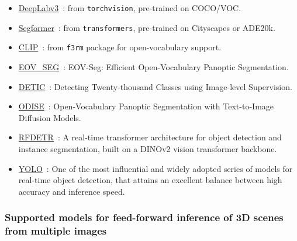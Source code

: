 \documentclass{article}
\providecommand{\tightlist}{%
  \setlength{\itemsep}{0pt}\setlength{\parskip}{0pt}}
\begin{document}
\begin{itemize}
\tightlist
\item
  \href{https://arxiv.org/abs/1706.05587}{DeepLabv3}~\cite{chen2017rethinking}: from \texttt{torchvision}, pre-trained on COCO/VOC.
\item
  \href{https://arxiv.org/abs/2105.15203}{Segformer}~\cite{xie2021segformer}: from \texttt{transformers}, pre-trained on Cityscapes or ADE20k.
\item
  \href{https://arxiv.org/abs/2212.09506}{CLIP}~\cite{lin2023clip}: from \texttt{f3rm} package for open-vocabulary support.
\item
  \href{https://arxiv.org/abs/2412.08628v1}{EOV\_SEG}~\cite{eov_seg}: EOV-Seg: Efficient Open-Vocabulary Panoptic Segmentation.
\item
  \href{https://arxiv.org/abs/2201.02605}{DETIC}~\cite{detic}: Detecting Twenty-thousand Classes using Image-level Supervision.
\item
  \href{https://arxiv.org/abs/2303.04803}{ODISE}~\cite{odise}: Open-Vocabulary Panoptic Segmentation with Text-to-Image Diffusion Models.
\item
  \href{https://arxiv.org/abs/2511.09554}{RFDETR}~\cite{rfdetr}: A real-time transformer architecture for object detection and instance segmentation, built on a DINOv2 vision transformer backbone.
\item
  \href{https://arxiv.org/abs/2510.09653}{YOLO}~\cite{sapkota2025ultralytics}: One of the most influential and widely adopted series of models for real-time object detection, that attains an excellent balance
between high accuracy and inference speed.
\end{itemize}
\hypertarget{supported-models-for-feed-forward-inference-of-3d-scenes-from-multiple-images}{%
\subsubsection{Supported models for feed-forward inference of 3D scenes
from multiple
images}\label{supported-models-for-feed-forward-inference-of-3d-scenes-from-multiple-images}}
\end{document}

